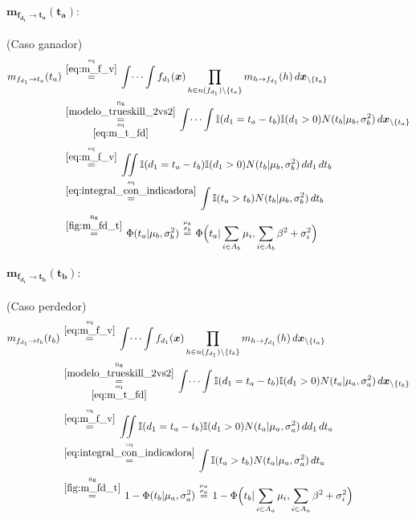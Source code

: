 \documentclass[article]{jss}
\newcommand\hfrac[2]{\genfrac{}{}{0pt}{}{#1}{#2}} %
\begin{document}
\paragraph{$\bm{m_{f_{d_1} \rightarrow t_a}(t_a)}:$} (Caso ganador)
\begin{equation}\label{eq:m_fd_ta}
\begin{split}
m_{f_{d_1} \rightarrow t_a}(t_a) & \overset{\hfrac{\text{eq}}{\ref{eq:m_f_v}}}{=} \int \dots \int f_{d_1}(\bm{x}) \prod_{h \in n(f_{d_1}) \setminus \{t_a\} } m_{h \rightarrow f_{d_1}}(h) \, d\bm{x}_{\setminus \{t_a\} }  \\
&\overset{\hfrac{\text{fig}}{\ref{modelo_trueskill_2vs2}}}{\underset{\hfrac{\text{eq}}{\ref{eq:m_t_fd}}}{=}}  \int \dots \int \mathbb{I}(d_1 = t_a - t_b) \mathbb{I}(d_1 > 0) N(t_b | \mu_b , \sigma_b^2 )  \, d\bm{x}_{\setminus \{t_a\} } \\[0.1cm]
& \overset{\hfrac{\text{eq}}{\ref{eq:m_f_v}}}{=} \iint \mathbb{I}(d_1 = t_a - t_b) \mathbb{I}(d_1 > 0) N(t_b | \mu_b , \sigma_b^2 ) \, dd_1\,dt_b \\
& \overset{\hfrac{\text{eq}}{\ref{eq:integral_con_indicadora}}}{=} \int \mathbb{I}( t_a > t_b)  N(t_b | \mu_b , \sigma_b^2 ) \,dt_b  \\
& \overset{\hfrac{\text{fig}}{\ref{fig:m_fd_t}}}{=} \Phi (t_a| \mu_b, \sigma_b^2)  \overset{\hfrac{\mu_b}{\sigma_b}}{=}  \Phi \Big(t_a| \sum_{i \in A_b} \mu_i , \sum_{i \in A_b} \beta^2 + \sigma_i^2 \Big)
\end{split}
\end{equation}

\paragraph{$\bm{m_{f_{d_1} \rightarrow t_b}(t_b)}:$} (Caso perdedor)
\begin{equation}\label{eq:m_fd_tb}
\begin{split}
m_{f_{d_1} \rightarrow t_b}(t_b) &\overset{\hfrac{\text{eq}}{\ref{eq:m_f_v}}}{=} \int \dots \int f_{d_1}(\bm{x}) \prod_{h \in n(f_{d_1}) \setminus \{t_b\} } m_{h \rightarrow f_{d_1}}(h) \, d\bm{x}_{\setminus \{t_a\} }  \\
&\overset{\hfrac{\text{fig}}{\ref{modelo_trueskill_2vs2}}}{\underset{\hfrac{\text{eq}}{\ref{eq:m_t_fd}}}{=}}  \int \dots \int \mathbb{I}(d_1 = t_a - t_b) \mathbb{I}(d_1 > 0) N(t_a | \mu_a , \sigma_a^2 )  \, d\bm{x}_{\setminus \{t_b\} } \\[0.1cm]
&\overset{\hfrac{\text{eq}}{\ref{eq:m_f_v}}}{=} \iint \mathbb{I}(d_1 = t_a - t_b) \mathbb{I}(d_1 > 0)  N(t_a | \mu_a , \sigma_a^2 )  \, dd_1\,dt_a \\
&\overset{\hfrac{\text{eq}}{\ref{eq:integral_con_indicadora}}}{=} \int \mathbb{I}( t_a > t_b)   N(t_a | \mu_a , \sigma_a^2 ) \,dt_a \\
&\overset{\hfrac{\text{fig}}{\ref{fig:m_fd_t}}}{=} 1 - \Phi (t_b| \mu_a , \sigma_a^2 ) \overset{\hfrac{\mu_a}{\sigma_a}}{=} 1 - \Phi \Big(t_b| \sum_{i \in A_a} \mu_i , \sum_{i \in A_a} \beta^2 + \sigma_i^2 \Big)
\end{split}
\end{equation}
\end{document}
